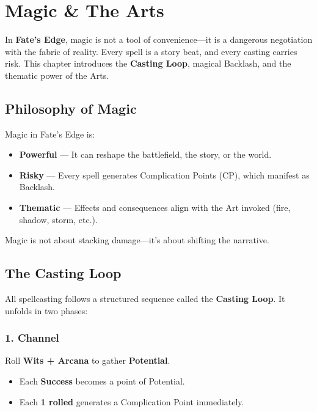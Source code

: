 
\chapter{Magic \& The Arts}

In \textbf{Fate’s Edge}, magic is not a tool of convenience—it is a dangerous negotiation with the fabric of reality. Every spell is a story beat, and every casting carries risk. This chapter introduces the \textbf{Casting Loop}, magical Backlash, and the thematic power of the Arts.

\section{Philosophy of Magic}

Magic in Fate’s Edge is:

\begin{itemize}
  \item \textbf{Powerful} — It can reshape the battlefield, the story, or the world.
  \item \textbf{Risky} — Every spell generates Complication Points (CP), which manifest as Backlash.
  \item \textbf{Thematic} — Effects and consequences align with the Art invoked (fire, shadow, storm, etc.).
\end{itemize}

Magic is not about stacking damage—it’s about shifting the narrative.

\section{The Casting Loop}

All spellcasting follows a structured sequence called the \textbf{Casting Loop}. It unfolds in two phases:

\subsection*{1. Channel}

Roll \textbf{Wits + Arcana} to gather \textbf{Potential}.

\begin{itemize}
  \item Each \textbf{Success} becomes a point of Potential.
  \item Each \textbf{1 rolled} generates a Complication Point immediately.
\end{itemize}

